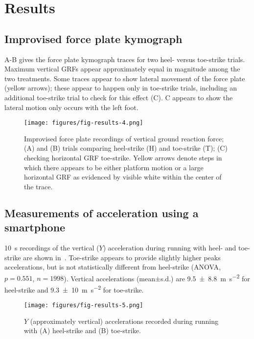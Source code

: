\section{Results}
\label{sec:results}

\subsection{Improvised force plate kymograph}
A-B gives the force plate kymograph traces for two heel- versus toe-strike trials. Maximum vertical GRFs appear approximately equal in magnitude among the two treatments.  Some traces appear to show lateral movement of the force plate (yellow arrows); these appear to happen only in toe-strike trials, including an additional toe-strike trial to check for this effect (C). C appears to show the lateral motion only occurs with the left foot. 
\begin{figure}
\begin{center}
\texttt{[image: figures/fig-results-4.png]}
\end{center}
\caption{Improvised force plate recordings of vertical ground reaction force; (A) and (B) trials comparing heel-strike (H) and toe-strike (T); (C) checking horizontal GRF toe-strike. Yellow arrows denote steps in which there appears to be either platform motion or a large horizontal GRF as evidenced by visible white within the center of the trace.}
\label{fig:results:forceplate}
\end{figure}





\subsection{Measurements of acceleration using a smartphone}
\SI{10}{\second} recordings of the vertical ($Y$) acceleration during running with heel- and toe-strike are shown in~. Toe-strike appears to provide slightly higher peaks accelerations, but is not statistically different from heel-strike (ANOVA, $p=0.551$, $n=1998$). Vertical accelerations (mean$\pm$s.d.) are \SI{9.5\pm8.8}{\meter\per\second\squared} for heel-strike and \SI{9.3\pm10}{\meter\per\second\squared} for toe-strike. 
\begin{figure}[h]
\begin{center}
\texttt{[image: figures/fig-results-5.png]}
\end{center}
\caption{$Y$ (approximately vertical) accelerations recorded during running with (A) heel-strike and (B) toe-strike.}
\label{fig:results:accel}
\end{figure}





